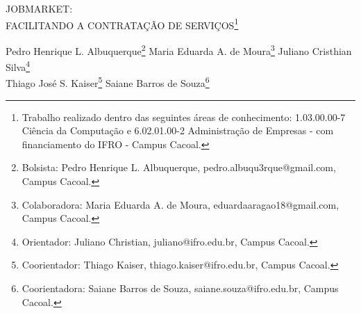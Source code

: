 \documentclass[article,12pt,onesidea,4paper,english,brazil]{abntex2}
\begin{document}
	
	
	\frenchspacing 
	
	\begin{center}
		\LARGE JOBMARKET:\\FACILITANDO A CONTRATAÇÃO DE SERVIÇOS\footnote{Trabalho realizado dentro das seguintes áreas de conhecimento: 1.03.00.00-7 Ciência da
			Computação e 6.02.01.00-2 Administração de Empresas - com financiamento do IFRO -
			Campus Cacoal.}
		
		\normalsize
		Pedro Henrique L. Albuquerque\footnote{Bolsista: Pedro Henrique L. Albuquerque, pedro.albuqu3rque@gmail.com, Campus Cacoal.} 
		Maria Eduarda A. de Moura\footnote{Colaboradora: Maria Eduarda A. de Moura, eduardaaragao18@gmail.com, Campus Cacoal.} 
		Juliano Cristhian Silva\footnote{Orientador: Juliano Christian, juliano@ifro.edu.br, Campus Cacoal.} \\
		Thiago José S. Kaiser\footnote{Coorientador: Thiago Kaiser, thiago.kaiser@ifro.edu.br, Campus Cacoal.}
		Saiane Barros de Souza\footnote{Coorientadora: Saiane Barros de Souza, saiane.souza@ifro.edu.br, Campus Cacoal.}
		 
	\end{center}
	
\end{document}
